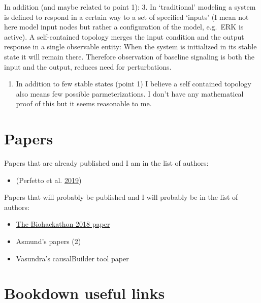 \documentclass[
  12pt,
]{book}
\providecommand{\tightlist}{%
  \setlength{\itemsep}{0pt}\setlength{\parskip}{0pt}}
\begin{document}
In addition (and maybe related to point 1):
3. In `traditional' modeling a system is defined to respond in a certain way to a set of specified `inputs' (I mean not here model input nodes but rather a configuration of the model, e.g.~ERK is active).
A self-contained topology merges the input condition and the output response in a single observable entity: When the system is initialized in its stable state it will remain there.
Therefore observation of baseline signaling is both the input and the output, reduces need for perturbations.

\begin{enumerate}
\def\labelenumi{\arabic{enumi}.}
\setcounter{enumi}{3}
\tightlist
\item
  In addition to few stable states (point 1) I believe a self contained topology also means few possible parmeterizations.
  I don't have any mathematical proof of this but it seems reasonable to me.
\end{enumerate}

\hypertarget{appendix-appendix}{%
\appendix}


\hypertarget{papers-1}{%
\chapter*{Papers}\label{papers-1}}

Papers that are already published and I am in the list of authors:

\begin{itemize}
\tightlist
\item
  (Perfetto et al. \protect\hyperlink{ref-Perfetto2019}{2019})
\end{itemize}

Papers that will probably be published and I will probably be in the list of authors:

\begin{itemize}
\tightlist
\item
  \href{https://www.tinyurl.com/bh2018write}{The Biohackathon 2018 paper}
\item
  Asmund's papers (2)
\item
  Vasundra's causalBuilder tool paper
\end{itemize}

\hypertarget{bookdown-useful-links}{%
\chapter*{Bookdown useful links}\label{bookdown-useful-links}}
\end{document}
